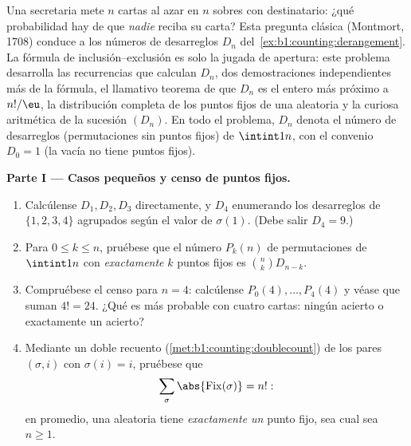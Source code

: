 \begin{problem}\label{pb:b1:counting:1}
Una secretaria mete $n$ cartas al azar en $n$ sobres con destinatario:
¿qué probabilidad hay de que \emph{nadie} reciba su carta? Esta
pregunta clásica (Montmort, 1708) conduce a los números de desarreglos
$D_n$ del~\cref{ex:b1:counting:derangement}. La fórmula de
inclusión--exclusión es solo la jugada de apertura: este problema
desarrolla las recurrencias que calculan $D_n$, dos demostraciones
independientes más de la fórmula, el llamativo teorema de que $D_n$ es
el entero más próximo a $n!/\eu$, la distribución completa de los
puntos fijos de una  aleatoria y la curiosa aritmética de la
sucesión $(D_n)$.
En todo el problema, $D_n$ denota el número de desarreglos
(permutaciones sin puntos fijos) de $\intint1n$, con el convenio
$D_0 = 1$ (la  vacía no tiene puntos fijos).

\medskip
\noindent\textbf{Parte I --- Casos pequeños y censo de puntos
fijos.}
\begin{enumerate}
  \item Calcúlense $D_1, D_2, D_3$ directamente, y $D_4$ enumerando los
        desarreglos de $\{1, 2, 3, 4\}$ agrupados según el valor de
        $\sigma(1)$. (Debe salir $D_4 = 9$.)
  \item Para $0 \leq k \leq n$, pruébese que el número $P_k(n)$ de
        permutaciones de $\intint1n$ con \emph{exactamente} $k$ puntos
        fijos es $\binom nk D_{n-k}$.
  \item Compruébese el censo para $n = 4$: calcúlense $P_0(4), \dots,
        P_4(4)$ y véase que suman $4! = 24$. ¿Qué es más probable con
        cuatro cartas: ningún acierto o exactamente un acierto?
  \item Mediante un doble recuento (\cref{met:b1:counting:doublecount})
        de los pares $(\sigma, i)$ con $\sigma(i) = i$, pruébese que
        \[
        \sum_{\sigma} \abs{\mathrm{Fix}(\sigma)} = n! :
        \]
        en promedio, una  aleatoria tiene \emph{exactamente
        un} punto fijo, sea cual sea $n \geq 1$.
\end{enumerate}


\end{problem}
